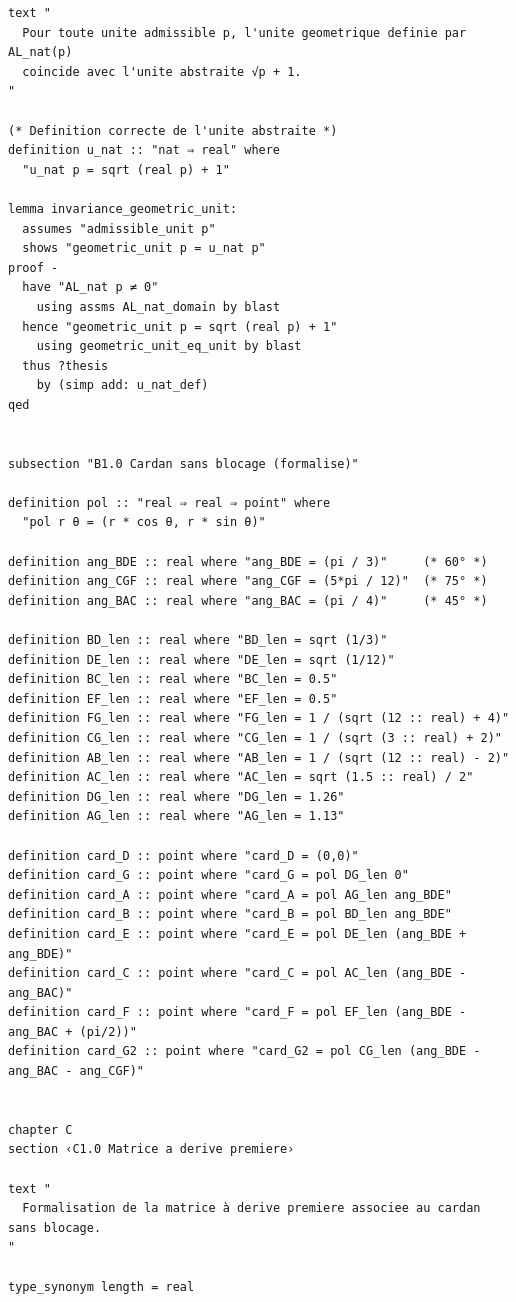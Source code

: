 \documentclass[12pt,a4paper]{article}
\begin{document}
\begin{lstlisting}[style=isabellegray]
text "
  Pour toute unite admissible p, l'unite geometrique definie par AL_nat(p)
  coincide avec l'unite abstraite √p + 1.
"

(* Definition correcte de l'unite abstraite *)
definition u_nat :: "nat ⇒ real" where
  "u_nat p = sqrt (real p) + 1"

lemma invariance_geometric_unit:
  assumes "admissible_unit p"
  shows "geometric_unit p = u_nat p"
proof -
  have "AL_nat p ≠ 0"
    using assms AL_nat_domain by blast
  hence "geometric_unit p = sqrt (real p) + 1"
    using geometric_unit_eq_unit by blast
  thus ?thesis
    by (simp add: u_nat_def)
qed


subsection "B1.0 Cardan sans blocage (formalise)"

definition pol :: "real ⇒ real ⇒ point" where
  "pol r θ = (r * cos θ, r * sin θ)"

definition ang_BDE :: real where "ang_BDE = (pi / 3)"     (* 60° *)
definition ang_CGF :: real where "ang_CGF = (5*pi / 12)"  (* 75° *)
definition ang_BAC :: real where "ang_BAC = (pi / 4)"     (* 45° *)

definition BD_len :: real where "BD_len = sqrt (1/3)"
definition DE_len :: real where "DE_len = sqrt (1/12)"
definition BC_len :: real where "BC_len = 0.5"
definition EF_len :: real where "EF_len = 0.5"
definition FG_len :: real where "FG_len = 1 / (sqrt (12 :: real) + 4)"
definition CG_len :: real where "CG_len = 1 / (sqrt (3 :: real) + 2)"
definition AB_len :: real where "AB_len = 1 / (sqrt (12 :: real) - 2)"
definition AC_len :: real where "AC_len = sqrt (1.5 :: real) / 2"
definition DG_len :: real where "DG_len = 1.26"
definition AG_len :: real where "AG_len = 1.13"

definition card_D :: point where "card_D = (0,0)"
definition card_G :: point where "card_G = pol DG_len 0"
definition card_A :: point where "card_A = pol AG_len ang_BDE"
definition card_B :: point where "card_B = pol BD_len ang_BDE"
definition card_E :: point where "card_E = pol DE_len (ang_BDE + ang_BDE)"
definition card_C :: point where "card_C = pol AC_len (ang_BDE - ang_BAC)"
definition card_F :: point where "card_F = pol EF_len (ang_BDE - ang_BAC + (pi/2))"
definition card_G2 :: point where "card_G2 = pol CG_len (ang_BDE - ang_BAC - ang_CGF)"


chapter C
section ‹C1.0 Matrice a derive premiere›

text "
  Formalisation de la matrice à derive premiere associee au cardan sans blocage.
"

type_synonym length = real


\end{lstlisting}
\end{document}
